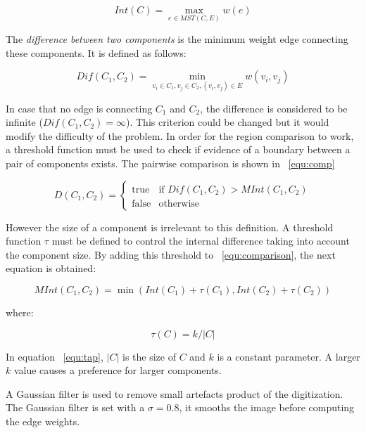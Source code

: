 \begin{equation}
 Int(C) = \max_{e \in MST(C,E)} w(e)
 \label{equ:mst}
\end{equation}

The \textit{difference between two components} is the minimum weight edge connecting these components. It is defined as follows: 

\begin{equation}
 Dif(C_{1},C_{2}) = \min_{v_{i} \in C_{1} , v_{j} \in C_{2} , (v_{i},v_{j}) \in E} w(v_{i},v_{j})
\end{equation}

In case that no edge is connecting \(C_{1}\) and \(C_{2}\), the difference is considered to be infinite (\(Dif(C_{1},C_{2}) = \infty\)). This criterion could be changed but it would modify the difficulty of the problem.
In order for the region comparison to work, a threshold function must be used to check if evidence of a boundary between a pair of components exists. The pairwise comparison is shown in ~\ref{equ:comp}

\begin{equation}
 D(C_{1},C_{2}) = \begin{cases} \mbox{true} & \mbox{if } Dif(C_{1},C_{2}) > MInt(C_{1},C_{2})\\ \mbox{false} & \mbox{otherwise} \end{cases}
 \label{equ:comp}
\end{equation}

However the size of a component is irrelevant to this definition. A threshold function \(\tau\) must be defined to control the internal difference taking into account the component size.
By adding this threshold to ~\ref{equ:comparison}, the next equation is obtained:

\begin{equation}
 MInt(C_{1},C_{2}) = \min (Int(C_{1})+\tau(C_{1}),Int(C_{2})+\tau(C_{2}))
\end{equation}

where:

\begin{equation}
 \tau(C) = k/|C|
 \label{equ:tap}
\end{equation}

In equation ~\ref{equ:tap}, \(|C|\) is the size of \(C\) and \(k\) is a constant parameter.
A larger \(k\) value causes a preference for larger components. 

A Gaussian filter is used to remove small artefacts product of the digitization. The Gaussian filter is set with a \(\sigma = 0.8\), it smooths the image before computing the edge weights.

